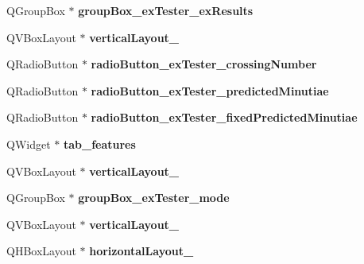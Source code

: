 \begin{DoxyCompactItemize}
\item 
\mbox{\label{class_ui___main_window_aea9b7deea38f74f370e7473308279ed8}} 
Q\+Group\+Box $\ast$ {\bfseries group\+Box\+\_\+ex\+Tester\+\_\+ex\+Results}
\item 
\mbox{\label{class_ui___main_window_ad0226b0a24707e35a6d99d6df65923fe}} 
Q\+V\+Box\+Layout $\ast$ {\bfseries vertical\+Layout\+\_}
\item 
\mbox{\label{class_ui___main_window_af9d9682f358bb018e8864df8e6555c41}} 
Q\+Radio\+Button $\ast$ {\bfseries radio\+Button\+\_\+ex\+Tester\+\_\+crossing\+Number}
\item 
\mbox{\label{class_ui___main_window_a78a96723a81171bd129245ea8595bb0e}} 
Q\+Radio\+Button $\ast$ {\bfseries radio\+Button\+\_\+ex\+Tester\+\_\+predicted\+Minutiae}
\item 
\mbox{\label{class_ui___main_window_afacf76506b4009c8d22e3557b826e6c2}} 
Q\+Radio\+Button $\ast$ {\bfseries radio\+Button\+\_\+ex\+Tester\+\_\+fixed\+Predicted\+Minutiae}
\item 
\mbox{\label{class_ui___main_window_a24041d242b07fa9ea302dcc09b4c66a3}} 
Q\+Widget $\ast$ {\bfseries tab\+\_\+features}
\item 
\mbox{\label{class_ui___main_window_aad710a6090d7e0db2acee6b26550b0fd}} 
Q\+V\+Box\+Layout $\ast$ {\bfseries vertical\+Layout\+\_}
\item 
\mbox{\label{class_ui___main_window_a927e245ee635df5b4f5a77f0d416bea1}} 
Q\+Group\+Box $\ast$ {\bfseries group\+Box\+\_\+ex\+Tester\+\_\+mode}
\item 
\mbox{\label{class_ui___main_window_a8e3f956e16795bb2d05bf823b1deb6ef}} 
Q\+V\+Box\+Layout $\ast$ {\bfseries vertical\+Layout\+\_}
\item 
\mbox{\label{class_ui___main_window_aa8e5752e2788dc8fd54f14b1bdd4b52c}} 
Q\+H\+Box\+Layout $\ast$ {\bfseries horizontal\+Layout\+\_}

\end{DoxyCompactItemize}
